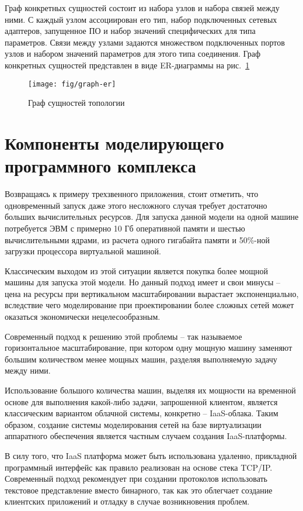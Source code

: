 Граф конкретных сущностей состоит из 
набора узлов и набора связей между ними. 
С каждый узлом ассоциирован его тип, набор подключенных сетевых адаптеров, запущенное ПО и 
набор значений специфических для типа параметров. 
Связи между узлами задаются множеством подключенных портов узлов 
и набором значений параметров для этого типа соединения.
Граф конкретных сущностей представлен в виде ER-диаграммы на рис.~\ref{fig:graph-er}
\begin{figure}
  \centering
  {\texttt{[image: fig/graph-er]}}
  \caption{Граф сущностей топологии}
  \label{fig:graph-er}
\end{figure} 

\section{Компоненты моделирующего программного комплекса}

Возвращаясь к примеру трехзвенного приложения, стоит отметить, что одновременный запуск
даже этого несложного случая требует достаточно больших вычислительных ресурсов.
Для запуска данной модели на одной машине потребуется ЭВМ с примерно 10 Гб оперативной
памяти и шестью вычислительными ядрами, из расчета одного гигабайта памяти и 50\%-ной
загрузки процессора виртуальной машиной.

Классическим выходом из этой ситуации является покупка более мощной машины для запуска
этой модели. Но данный подход имеет и свои минусы -- цена на ресурсы при вертикальном
масштабировании вырастает экспоненциально, вследствие чего моделирование при 
проектировании более сложных сетей может оказаться экономически нецелесообразным.

Современный подход к решению этой проблемы -- так называемое горизонтальное 
масштабирование, при котором одну мощную машину заменяют большим количеством
менее мощных машин, разделяя выполняемую задачу между ними.

Использование большого количества машин, выделяя их мощности на временной основе для
выполнения какой-либо задачи, запрошенной клиентом, является классическим вариантом
облачной системы, конкретно --  IaaS-облака.
Таким образом, создание системы моделирования сетей на базе виртуализации 
аппаратного обеспечения является частным случаем создания IaaS-платформы.

В силу того, что IaaS платформа может быть использована удаленно, прикладной программный
интерфейс как правило реализован на основе стека TCP/IP. Современный подход рекомендует
при создании протоколов использовать текстовое представление вместо бинарного, так как
это облегчает создание клиентских приложений и отладку в случае возникновения проблем.

